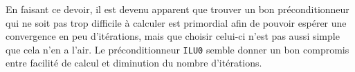 \documentclass[11pt]{article}
\begin{document}
En faisant ce devoir, il est devenu apparent que trouver un bon préconditionneur qui ne soit pas trop difficile à calculer est primordial afin de pouvoir espérer une convergence en peu d'itérations, mais que choisir celui-ci n'est pas aussi simple que cela n'en a l'air. Le préconditionneur \texttt{ILU0} semble donner un bon compromis entre facilité de calcul et diminution du nombre d'itérations.
\end{document}
